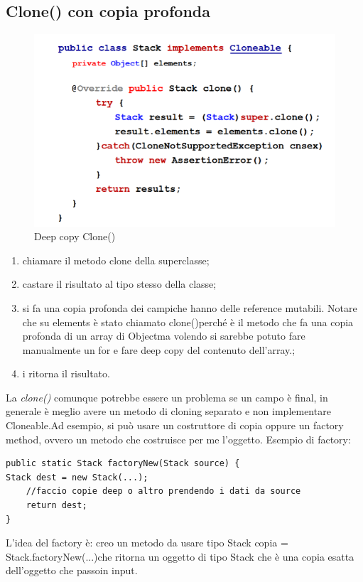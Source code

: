 \subsection{Clone() con copia profonda}
\begin{figure}[H]
\centering
\includegraphics[scale=0.8]{images/deepCopyClone}
\caption{Deep copy Clone()\label{fig:UC3}}
\end{figure}
\begin{enumerate}
\item chiamare il metodo clone della superclasse;
\item castare il risultato al tipo stesso della classe;
\item si fa una copia profonda dei campiche hanno delle reference mutabili. Notare che su elements è stato chiamato clone()perché è il metodo che fa una copia profonda di un array di Objectma volendo si sarebbe potuto fare manualmente un for e fare deep copy del contenuto dell’array.;
\item i ritorna il risultato.
\end{enumerate}
La \textit{clone()} comunque potrebbe essere un problema se un campo è final, in generale è meglio avere un metodo di cloning separato e non implementare Cloneable.Ad esempio, si può usare un costruttore di copia oppure un factory method, ovvero un metodo che costruisce per me l’oggetto. Esempio di factory:
\begin{lstlisting}
public static Stack factoryNew(Stack source) {
Stack dest = new Stack(...);
	//faccio copie deep o altro prendendo i dati da source 
	return dest;
}
\end{lstlisting}
L’idea del factory è: creo un metodo da usare tipo Stack copia = Stack.factoryNew(...)che ritorna un oggetto di tipo Stack che è una copia esatta dell’oggetto che passoin input.